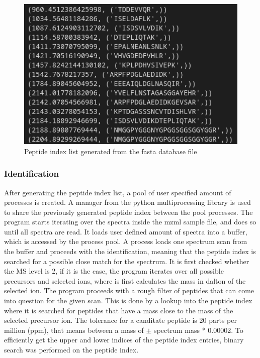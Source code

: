 \documentclass[11pt]{article}
\begin{document}
\begin{figure}
\includegraphics[width=\linewidth]{figs/peptindex.png} 
\caption{Peptide index list generated from the fasta database file}
\label{fig:peptindex}
\end{figure}

\subsubsection{Identification}
After generating the peptide index list, a pool of user specified amount of processes is created. A manager from the python multiprocessing library is used to share the previously generated peptide index between the pool processes. The program starts iterating over the spectra inside the mzml sample file, and does so until all spectra are read. It loads user defined amount of spectra into a buffer, which is accessed by the process pool. A process loads one spectrum scan from the buffer and proceeds with the identification, meaning that the peptide index is searched for a possible close match for the spectrum.
It is first checked whether the MS level is 2, if it is the case, the program iterates over all possible precursors and selected ions, where is first calculates the mass in dalton of the selected ion.
The program proceeds with a rough filter of peptides that can come into question for the given scan. This is done by a lookup into the peptide index where it is searched for peptides that have a mass close to the mass of the selected precursor ion. The tolerance for a canditate peptide is 20 parts per million (ppm), that means between a mass of $\pm$ spectrum mass * 0.00002.
To efficiently get the upper and lower indices of the peptide index entries, binary search was performed on the peptide index.
\end{document}
